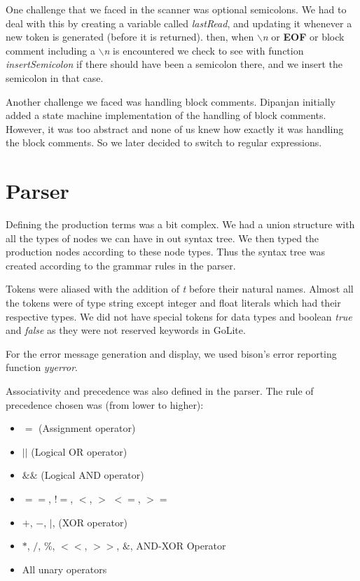 \documentclass[a4paper]{article}
\begin{document}
One challenge that we faced in the scanner was optional semicolons. We had to deal with this by creating a variable called \textit{lastRead}, and updating it whenever a new token is generated (before it is returned). then, when \textit{$\backslash$n} or \textbf{EOF} or block comment including a \textit{$\backslash$n} is encountered we check to see with function \textit{insertSemicolon} if there should have been a semicolon there, and we insert the semicolon in that case.

Another challenge we faced was handling block comments. Dipanjan initially added a state machine implementation of the handling of block comments. However, it was too abstract and none of us knew how exactly it was handling the block comments. So we later decided to switch to regular expressions.


\section{Parser}

Defining the production terms was a bit complex. We had a union structure with all the types of nodes we can have in out syntax tree. We then typed the production nodes according to these node types. Thus the syntax tree was created according to the grammar rules in the parser.

Tokens were aliased with the addition of \textit{t} before their natural names. Almost all the tokens were of type string except integer and float literals which had their respective types. We did not have special tokens for data types and boolean \textit{true} and \textit{false} as they were not reserved keywords in GoLite.

For the error message generation and display, we used bison's error reporting function \textit{yyerror}. 

Associativity and precedence was also defined in the parser. The rule of precedence chosen was (from lower to higher):

\begin{itemize}
\item $=$ (Assignment operator)
\item $||$ (Logical OR operator)
\item $\&\&$ (Logical AND operator)
\item $==$, $!=$, $<$, $>$ $<=$, $>=$
\item $+$, $-$, $|$, (XOR operator)
\item $*$, $/$, $\%$, $<<$, $>>$, $\&$, AND-XOR Operator
\item All unary operators
\end{itemize}
\end{document}
